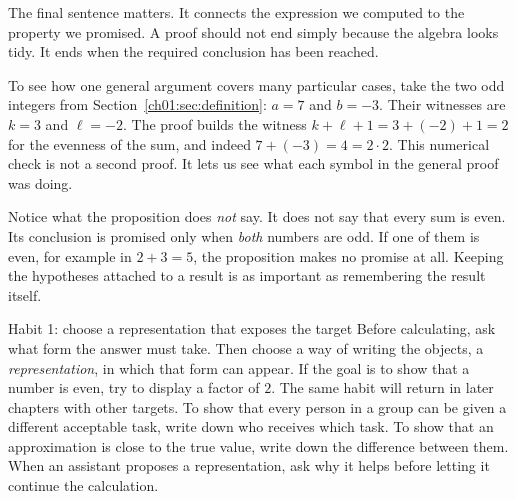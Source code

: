 The final sentence matters. It connects the expression we computed to the property we promised. A proof should not end simply because the algebra looks tidy. It ends when the required conclusion has been reached.

To see how one general argument covers many particular cases, take the two odd integers from Section~\ref{ch01:sec:definition}: $a=7$ and $b=-3$. Their witnesses are $k=3$ and $\ell=-2$. The proof builds the witness $k+\ell+1=3+(-2)+1=2$ for the evenness of the sum, and indeed $7+(-3)=4=2\cdot2$. This numerical check is not a second proof. It lets us see what each symbol in the general proof was doing.

Notice what the proposition does \emph{not} say. It does not say that every sum is even. Its conclusion is promised only when \emph{both} numbers are odd. If one of them is even, for example in $2+3=5$, the proposition makes no promise at all. Keeping the hypotheses attached to a result is as important as remembering the result itself.

\begin{principle}{Habit 1: choose a representation that exposes the target}
Before calculating, ask what form the answer must take. Then choose a way of writing the objects, a \emph{representation}, in which that form can appear. If the goal is to show that a number is even, try to display a factor of $2$. The same habit will return in later chapters with other targets. To show that every person in a group can be given a different acceptable task, write down who receives which task. To show that an approximation is close to the true value, write down the difference between them. When an assistant proposes a representation, ask why it helps before letting it continue the calculation.
\end{principle}
